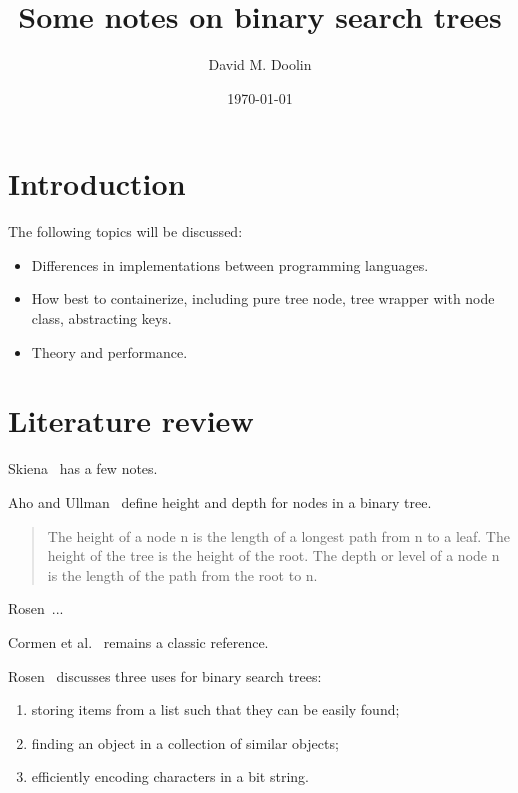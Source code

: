 \documentclass{article}
\title{Some notes on binary search trees}
\date{\today}
\author{David M. Doolin}
\begin{document}
\maketitle


\tableofcontents

\section{Introduction}


The following topics will be discussed:

\begin{itemize}

\item Differences in implementations between programming languages.
\item How best to containerize, including pure tree node, tree wrapper with
node class, abstracting keys.
\item Theory and performance.

\end{itemize}

\setcounter{sno}{0}
\newcommand\sno{\stepcounter{sno}$^{\thesno}$}


\section{Literature review}

Skiena~\cite[pp. 77, 370, 375, 589]{skiena} has a few notes.

Aho and Ullman~\cite[pp. 210]{aho:av:1992} define height and depth for nodes in a binary tree.

\begin{quote}
The height of a node n is the length of a longest path from n to
a leaf. The height of the tree is the height of the root. The depth or level of
a node n is the length of the path from the root to n.
\end{quote}

Rosen~\cite{rosen}...

Cormen et al.~\cite{cormen:th:1990} remains a classic reference.

Rosen~\cite[pp. 757-760]{rosen} discusses three uses for binary search trees:

\begin{enumerate}
\item storing items from a list such that they can be easily found;
\item finding an object in a collection of similar objects;
\item efficiently encoding characters in a bit string.
\end{enumerate}
\end{document}
